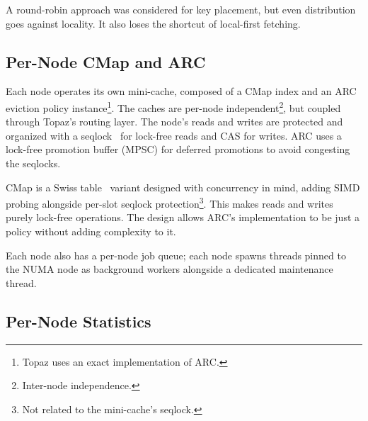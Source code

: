 \documentclass[sigplan,10pt]{acmart}
\begin{document}
A round-robin approach was considered for key placement, but even distribution goes against locality. 
It also loses the shortcut of local-first fetching.
\subsection{Per-Node CMap and ARC}

%
Each node operates its own mini-cache, composed of a CMap index and an ARC~\cite{arc} eviction policy instance\footnote{Topaz uses an exact implementation of ARC.}.
The caches are per-node independent\footnote{Inter-node independence.}, but coupled through Topaz's routing layer.
The node's reads and writes are protected and organized with a seqlock~\cite{seqlock} for
lock-free reads and CAS for writes.
ARC uses a lock-free promotion buffer (MPSC) for deferred promotions to avoid congesting the seqlocks.

CMap is a Swiss table~\cite{swisstable} variant designed with concurrency in mind, adding SIMD probing alongside per-slot seqlock protection\footnote{Not related to the mini-cache's seqlock.}.
This makes reads and writes purely lock-free operations.
The design allows ARC's implementation to be just a policy without adding complexity to it.

Each node also has a per-node job queue; each node spawns threads pinned to the NUMA node as background workers alongside a dedicated maintenance thread.
\subsection{Per-Node Statistics}
\end{document}
